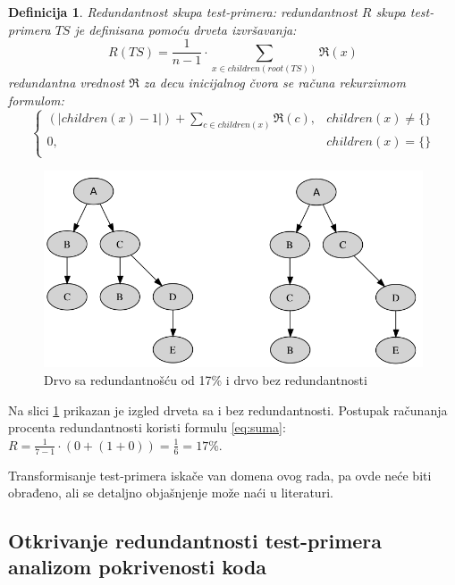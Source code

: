 \documentclass[a4paper]{article}
\newtheorem{definition}{Definicija}[section]
\begin{document}
\begin{definition}{Redundantnost skupa test-primera:}
redundantnost $R$ skupa test-primera $TS$ je definisana pomoću drveta izvršavanja:
\begin{equation}
\label{eq:suma}
    R(TS) = \frac{1}{n-1} \cdot \sum_{x \in children(root(TS))} \Re(x)
\end{equation}
redundantna vrednost $\Re$ za decu inicijalnog čvora se računa rekurzivnom formulom:
$$
    \begin{cases}
    (|children(x)-1|) + \sum_{c \in children(x)} \Re(c),  &  children(x) \neq \{\} \\
    0, &  children(x) = \{\} \\
    \end{cases}
$$
\end{definition}

\begin{figure}[h!]
\begin{center}
\includegraphics[scale=0.25]{redudancy.png}
\end{center}
\caption{Drvo sa redundantnošću od 17\% i drvo bez redundantnosti}
\label{fig:redundancy}
\end{figure}

Na slici \ref{fig:redundancy} prikazan je izgled drveta sa i bez redundantnosti. Postupak računanja procenta redundantnosti koristi formulu \ref{eq:suma}:
$ R = \frac{1}{7-1} \cdot (0 + (1+0)) = \frac{1}{6} = 17\% $.

Transformisanje test-primera iskače van domena ovog rada, pa ovde neće biti obrađeno, ali se detaljno objašnjenje može naći u literaturi\cite{prvinacin}.

\subsection{Otkrivanje redundantnosti test-primera analizom pokrivenosti koda}
\label{subsec:drugi}
\end{document}
